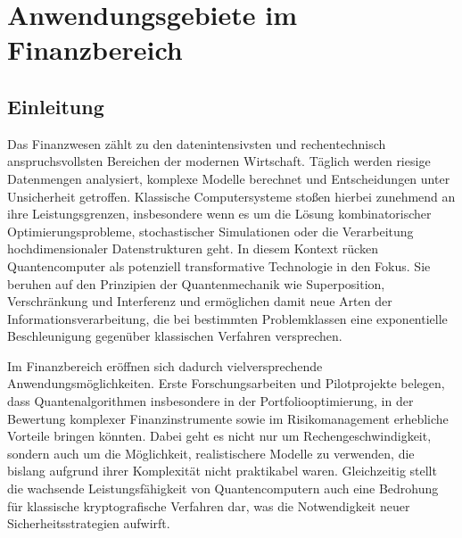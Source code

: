 \chapter{Anwendungsgebiete im Finanzbereich}
\label{trends} %



\section{Einleitung}
Das Finanzwesen zählt zu den datenintensivsten und rechentechnisch anspruchsvollsten Bereichen der modernen Wirtschaft. Täglich werden riesige Datenmengen analysiert, komplexe Modelle berechnet und Entscheidungen unter Unsicherheit getroffen. Klassische Computersysteme stoßen hierbei zunehmend an ihre Leistungsgrenzen, insbesondere wenn es um die Lösung kombinatorischer Optimierungsprobleme, stochastischer Simulationen oder die Verarbeitung hochdimensionaler Datenstrukturen geht. In diesem Kontext rücken Quantencomputer als potenziell transformative Technologie in den Fokus. Sie beruhen auf den Prinzipien der Quantenmechanik wie Superposition, Verschränkung und Interferenz und ermöglichen damit neue Arten der Informationsverarbeitung, die bei bestimmten Problemklassen eine exponentielle Beschleunigung gegenüber klassischen Verfahren versprechen.

Im Finanzbereich eröffnen sich dadurch vielversprechende Anwendungsmöglichkeiten. Erste Forschungsarbeiten und Pilotprojekte belegen, dass Quantenalgorithmen insbesondere in der Portfoliooptimierung, in der Bewertung komplexer Finanzinstrumente sowie im Risikomanagement erhebliche Vorteile bringen könnten. Dabei geht es nicht nur um Rechengeschwindigkeit, sondern auch um die Möglichkeit, realistischere Modelle zu verwenden, die bislang aufgrund ihrer Komplexität nicht praktikabel waren. Gleichzeitig stellt die wachsende Leistungsfähigkeit von Quantencomputern auch eine Bedrohung für klassische kryptografische Verfahren dar, was die Notwendigkeit neuer Sicherheitsstrategien aufwirft.

